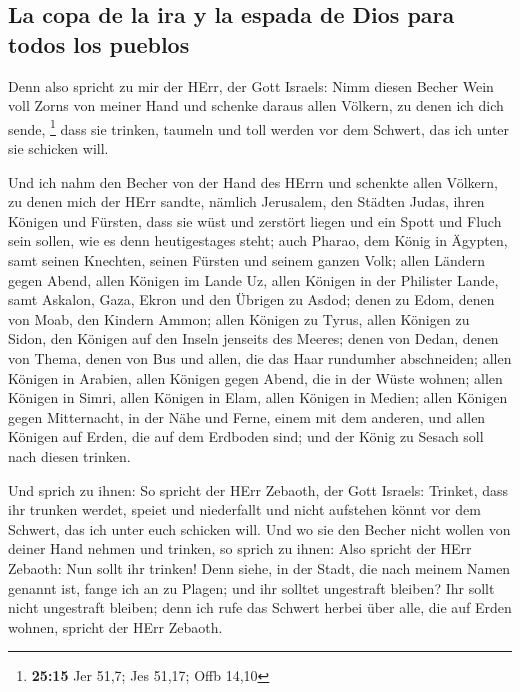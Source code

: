 \hypertarget{la-copa-de-la-ira-y-la-espada-de-dios-para-todos-los-pueblos}{%
\subsection{La copa de la ira y la espada de Dios para todos los
pueblos}\label{la-copa-de-la-ira-y-la-espada-de-dios-para-todos-los-pueblos}}

 Denn also spricht zu mir der HErr, der Gott Israels:
Nimm diesen Becher Wein voll Zorns von meiner Hand und schenke daraus
allen Völkern, zu denen ich dich sende, \footnote{\textbf{25:15} Jer
  51,7; Jes 51,17; Offb 14,10}  dass sie trinken, taumeln
und toll werden vor dem Schwert, das ich unter sie schicken will.

 Und ich nahm den Becher von der Hand des HErrn und
schenkte allen Völkern, zu denen mich der HErr sandte, 
nämlich Jerusalem, den Städten Judas, ihren Königen und Fürsten, dass
sie wüst und zerstört liegen und ein Spott und Fluch sein sollen, wie es
denn heutigestages steht;  auch Pharao, dem König in
Ägypten, samt seinen Knechten, seinen Fürsten und seinem ganzen Volk;
 allen Ländern gegen Abend, allen Königen im Lande Uz,
allen Königen in der Philister Lande, samt Askalon, Gaza, Ekron und den
Übrigen zu Asdod;  denen zu Edom, denen von Moab, den
Kindern Ammon;  allen Königen zu Tyrus, allen Königen zu
Sidon, den Königen auf den Inseln jenseits des Meeres; 
denen von Dedan, denen von Thema, denen von Bus und allen, die das Haar
rundumher abschneiden;  allen Königen in Arabien, allen
Königen gegen Abend, die in der Wüste wohnen;  allen
Königen in Simri, allen Königen in Elam, allen Königen in Medien;
 allen Königen gegen Mitternacht, in der Nähe und Ferne,
einem mit dem anderen, und allen Königen auf Erden, die auf dem Erdboden
sind; und der König zu Sesach soll nach diesen trinken.

 Und sprich zu ihnen: So spricht der HErr Zebaoth, der
Gott Israels: Trinket, dass ihr trunken werdet, speiet und niederfallt
und nicht aufstehen könnt vor dem Schwert, das ich unter euch schicken
will.  Und wo sie den Becher nicht wollen von deiner Hand
nehmen und trinken, so sprich zu ihnen: Also spricht der HErr Zebaoth:
Nun sollt ihr trinken!  Denn siehe, in der Stadt, die
nach meinem Namen genannt ist, fange ich an zu Plagen; und ihr solltet
ungestraft bleiben? Ihr sollt nicht ungestraft bleiben; denn ich rufe
das Schwert herbei über alle, die auf Erden wohnen, spricht der HErr
Zebaoth.

